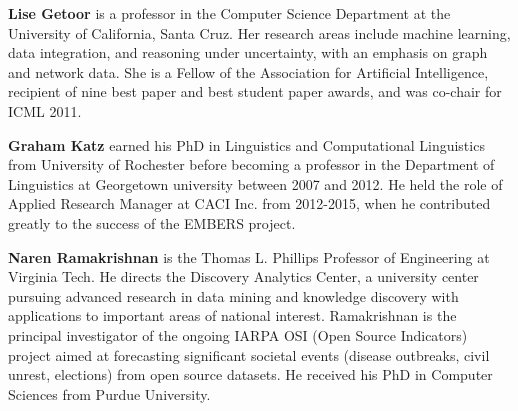 \documentclass[letterpaper]{article}
\begin{document}
{\bf Lise Getoor} is a professor in the Computer Science Department at
the University of California, Santa Cruz.   Her research areas include
machine learning, data integration, and reasoning under uncertainty,
with an emphasis on graph and network data. She is a Fellow of the
Association for Artificial Intelligence, recipient of nine best paper
and best student paper awards, and was co-chair for ICML 2011.
\par

{\bf Graham Katz} earned his PhD in Linguistics and Computational Linguistics
from University of Rochester before becoming a professor in the
Department of Linguistics at Georgetown university between 2007 and
2012.   He held the role of Applied Research Manager at CACI Inc. from
2012-2015, when he contributed greatly to the success of the EMBERS
project.
\par

{\bf Naren Ramakrishnan} is the Thomas L. Phillips Professor of Engineering at
Virginia Tech. He directs the Discovery Analytics Center, a university
center pursuing advanced research in data mining and knowledge discovery
with applications to important areas of national interest. Ramakrishnan
is the principal investigator of the ongoing IARPA OSI (Open Source
Indicators) project aimed at forecasting significant societal events
(disease outbreaks, civil unrest, elections) from open source datasets.
He received his PhD in Computer Sciences from Purdue University.
\end{document}
